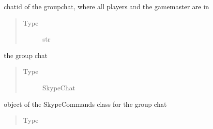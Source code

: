 \documentclass[letterpaper,10pt,english]{sphinxmanual}
\begin{document}
\begin{fulllineitems}

\begin{fulllineitems}
\label{\detokenize{chatwolf:chatwolf.game.Game.chatid}}
chatid of the group\sphinxhyphen{}chat, where all players and the game\sphinxhyphen{}master are in
\begin{quote}\begin{description}
\item[{Type}] \leavevmode
str

\end{description}\end{quote}

\end{fulllineitems}


\begin{fulllineitems}
\label{\detokenize{chatwolf:chatwolf.game.Game.chat}}
the group chat
\begin{quote}\begin{description}
\item[{Type}] \leavevmode
SkypeChat

\end{description}\end{quote}

\end{fulllineitems}


\begin{fulllineitems}
\label{\detokenize{chatwolf:chatwolf.game.Game.skc}}
object of the SkypeCommands class for the group chat
\begin{quote}\begin{description}
\item[{Type}] \leavevmode
{\hyperref[\detokenize{chatwolf:chatwolf.skypecommands.SkypeCommands}]{}}

\end{description}\end{quote}

\end{fulllineitems}


\end{fulllineitems}
\end{document}
